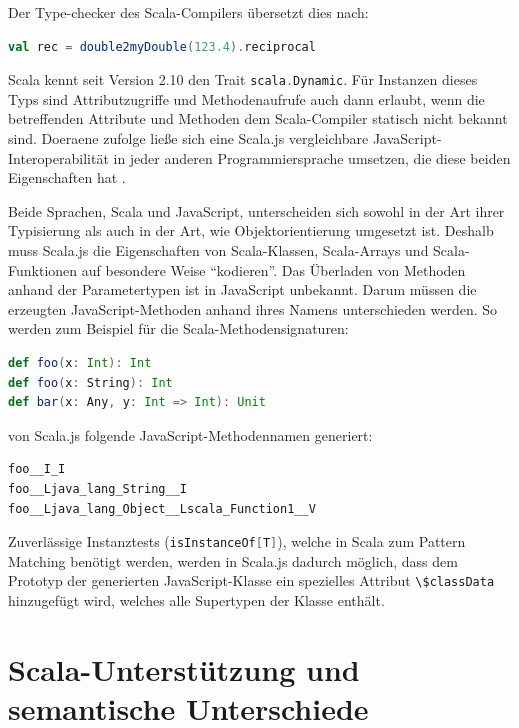 \documentclass[a4paper, 12pt, hidelinks, listof=totoc, listoftables=totoc, bibliography=totoc]{scrreprt}
\newcommand{\code}[1]{\lstinline[language=Scala, style=inline]|#1|}
\newcommand{\scala}[1]{\lstinline[language=Scala, style=inline]|#1|}
\begin{document}
Der Type-checker des Scala-Compilers übersetzt dies nach:

\begin{lstlisting}[language=Scala, style=snippet]
val rec = double2myDouble(123.4).reciprocal
\end{lstlisting}

Scala kennt seit Version 2.10 den Trait \scala{scala.Dynamic}. Für Instanzen dieses Typs sind Attributzugriffe und Methodenaufrufe auch dann erlaubt, wenn die betreffenden Attribute und Methoden dem Scala-Compiler statisch nicht bekannt sind. Doeraene zufolge ließe sich eine Scala.js vergleichbare JavaScript-Interoperabilität in jeder anderen Programmiersprache umsetzen, die diese beiden Eigenschaften hat \cite[S. 3]{doeraene2013.TDI}.

Beide Sprachen, Scala und JavaScript, unterscheiden sich sowohl in der Art ihrer Typisierung als auch in der Art, wie Objektorientierung umgesetzt ist. Deshalb muss Scala.js die Eigenschaften von Scala-Klassen, Scala-Arrays und Scala-Funktionen auf besondere Weise "`kodieren"'. Das Überladen von Methoden anhand der Parametertypen ist in \mbox{JavaScript} unbekannt. Darum müssen die erzeugten JavaScript-Methoden anhand ihres Namens unterschieden werden. So werden zum Beispiel für die Scala-Methodensignaturen:

\begin{lstlisting}[language=Scala, style=snippet]
def foo(x: Int): Int
def foo(x: String): Int
def bar(x: Any, y: Int => Int): Unit
\end{lstlisting}

von Scala.js folgende JavaScript-Methodennamen generiert:

\begin{lstlisting}[language=JavaScript, style=snippet]
foo__I_I
foo__Ljava_lang_String__I
foo__Ljava_lang_Object__Lscala_Function1__V
\end{lstlisting}

Zuverlässige Instanztests (\scala{isInstanceOf[T]}), welche in Scala zum Pattern Matching benötigt werden, werden in Scala.js dadurch möglich, dass dem Prototyp der generierten JavaScript-Klasse ein spezielles Attribut \code{\$classData} 
hinzugefügt wird, welches alle Supertypen der Klasse enthält. \cite[S. 3 f.]{doeraene2013.TDI}



\section{Scala-Unterstützung und semantische Unterschiede}
\end{document}
